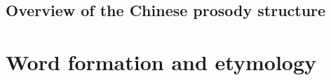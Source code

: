 \documentclass[UTF8, a4paper, oneside, scheme=plain]{ctexbook}
\numberwithin{equation}{chapter}
\begin{document}
\chapter{Overview of the Chinese prosody structure}\label{chap:prosody-overview}



\part{Word formation and etymology}





\printindex
\end{document}
